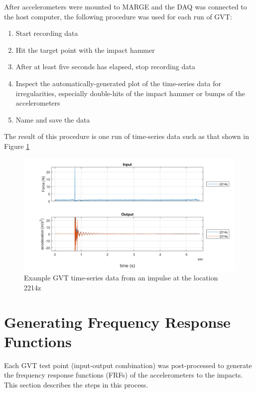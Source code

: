 After accelerometers were mounted to MARGE and the DAQ was connected to the host computer, the following procedure was used for each run of GVT:
\begin{enumerate}
	\item Start recording data
	\item Hit the target point with the impact hammer
	\item After at least five seconds has elapsed, stop recording data
	\item Inspect the automatically-generated plot of the time-series data for irregularities, especially double-hits of the impact hammer or bumps of the accelerometers
	\item Name and save the data
\end{enumerate}
The result of this procedure is one run of time-series data such as that shown in Figure \ref{fig:gvtTimeExample}
\begin{figure}[H]
	\centering
	\label{fig:gvtTimeExample}
	\includegraphics[width=6in]{figs/sampleGVT.png}
	\caption{Example GVT time-series data from an impulse at the location 2214z}
\end{figure}

\section{Generating Frequency Response Functions} %
\label{sec:generateFRF}

Each GVT test point (input-output combination) was post-processed to generate the frequency response functions (FRFs) of the accelerometers to the impacts. This section describes the steps in this process.

